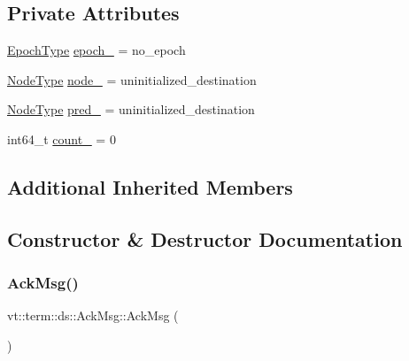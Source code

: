 \subsection*{Private Attributes}
\begin{DoxyCompactItemize}
\item 
\hyperlink{namespacevt_a985a5adf291c34a3ca263b3378388236}{Epoch\+Type} \hyperlink{structvt_1_1term_1_1ds_1_1_ack_msg_a9e1108b90e8002c95195aea6165fba07}{epoch\+\_\+} = no\+\_\+epoch
\item 
\hyperlink{namespacevt_a866da9d0efc19c0a1ce79e9e492f47e2}{Node\+Type} \hyperlink{structvt_1_1term_1_1ds_1_1_ack_msg_aa50a9f95bfb4126740accbce33706760}{node\+\_\+} = uninitialized\+\_\+destination
\item 
\hyperlink{namespacevt_a866da9d0efc19c0a1ce79e9e492f47e2}{Node\+Type} \hyperlink{structvt_1_1term_1_1ds_1_1_ack_msg_a5371aca85f6cc60da48b9a9314fa02ca}{pred\+\_\+} = uninitialized\+\_\+destination
\item 
int64\+\_\+t \hyperlink{structvt_1_1term_1_1ds_1_1_ack_msg_ab973f14171a2e53dfd812c08407b6a51}{count\+\_\+} = 0
\end{DoxyCompactItemize}
\subsection*{Additional Inherited Members}


\subsection{Constructor \& Destructor Documentation}
\mbox{\label{structvt_1_1term_1_1ds_1_1_ack_msg_aa455e4d0c3e93b196e8fc21f576a5d3e}} 
\subsubsection{\texorpdfstring{Ack\+Msg()}{AckMsg()}\hspace{0.1cm}{\footnotesize\ttfamily [1/2]}}
{\footnotesize\ttfamily vt\+::term\+::ds\+::\+Ack\+Msg\+::\+Ack\+Msg (\begin{DoxyParamCaption}{ }\end{DoxyParamCaption})\hspace{0.3cm}{\ttfamily [default]}}

